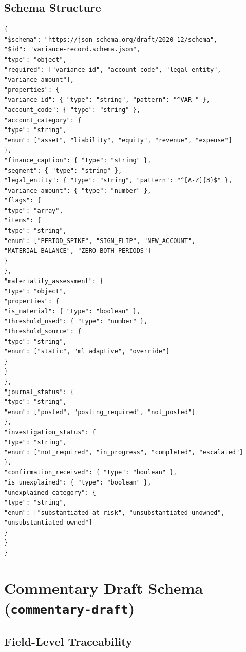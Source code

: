 \documentclass[11pt,a4paper,twoside]{report}
\newcommand{\schemaref}[1]{\texttt{#1}}
\begin{document}
\subsection{Schema Structure}

\begin{lstlisting}[language=jsonx,caption=Variance Record Schema (simplified)]
{
"$schema": "https://json-schema.org/draft/2020-12/schema",
"$id": "variance-record.schema.json",
"type": "object",
"required": ["variance_id", "account_code", "legal_entity",
"variance_amount"],
"properties": {
"variance_id": { "type": "string", "pattern": "^VAR-" },
"account_code": { "type": "string" },
"account_category": {
"type": "string",
"enum": ["asset", "liability", "equity", "revenue", "expense"]
},
"finance_caption": { "type": "string" },
"segment": { "type": "string" },
"legal_entity": { "type": "string", "pattern": "^[A-Z]{3}$" },
"variance_amount": { "type": "number" },
"flags": {
"type": "array",
"items": {
"type": "string",
"enum": ["PERIOD_SPIKE", "SIGN_FLIP", "NEW_ACCOUNT",
"MATERIAL_BALANCE", "ZERO_BOTH_PERIODS"]
}
},
"materiality_assessment": {
"type": "object",
"properties": {
"is_material": { "type": "boolean" },
"threshold_used": { "type": "number" },
"threshold_source": {
"type": "string",
"enum": ["static", "ml_adaptive", "override"]
}
}
},
"journal_status": {
"type": "string",
"enum": ["posted", "posting_required", "not_posted"]
},
"investigation_status": {
"type": "string",
"enum": ["not_required", "in_progress", "completed", "escalated"]
},
"confirmation_received": { "type": "boolean" },
"is_unexplained": { "type": "boolean" },
"unexplained_category": {
"type": "string",
"enum": ["substantiated_at_risk", "unsubstantiated_unowned",
"unsubstantiated_owned"]
}
}
}
\end{lstlisting}

\section{Commentary Draft Schema (\schemaref{commentary-draft})}
\label{sec:commentary-draft-schema}

\subsection{Field-Level Traceability}
\end{document}
